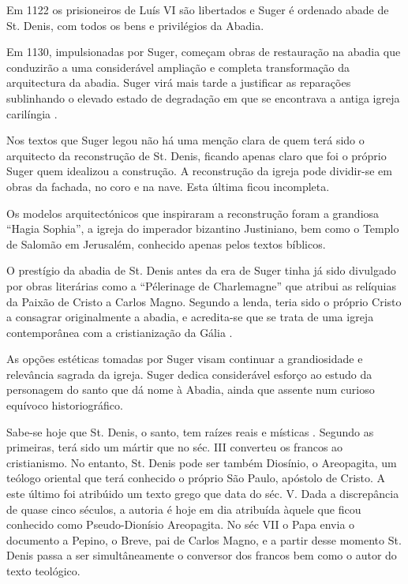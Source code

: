 \documentclass{article}
\begin{document}
Em 1122 os prisioneiros de Luís VI são libertados e Suger é ordenado
abade de St. Denis, com todos os bens e privilégios da Abadia.

Em 1130, impulsionadas por Suger, começam obras de restauração na
abadia que conduzirão a uma considerável ampliação e completa
transformação da arquitectura da abadia. Suger virá mais tarde a
justificar as reparações sublinhando o elevado estado de degradação em
que se encontrava a antiga igreja carilíngia \cite{calado}.

Nos textos que Suger legou não há uma menção clara de quem terá sido o
arquitecto da reconstrução de St. Denis, ficando apenas claro que foi
o próprio Suger quem idealizou a construção.  A reconstrução da igreja
pode dividir-se em obras da fachada, no coro e na nave. Esta última
ficou incompleta.

Os modelos arquitectónicos que inspiraram a reconstrução foram a
grandiosa ``Hagia Sophia'', a igreja do imperador bizantino
Justiniano, bem como o Templo de Salomão em Jerusalém, conhecido
apenas pelos textos bíblicos.

O prestígio da abadia de St. Denis antes da era de Suger tinha já sido
divulgado por obras literárias como a ``Pélerinage de Charlemagne''
que atribui as relíquias da Paixão de Cristo a Carlos Magno. Segundo a
lenda, teria sido o próprio Cristo a consagrar originalmente a abadia,
e acredita-se que se trata de uma igreja contemporânea com a
cristianização da Gália \cite{wiki-abadia}. 

As opções estéticas tomadas por Suger visam continuar a grandiosidade
e relevância sagrada da igreja. Suger dedica considerável esforço ao
estudo da personagem do santo que dá nome à Abadia, ainda que assente
num curioso equívoco historiográfico.

Sabe-se hoje que St. Denis, o santo, tem raízes reais e místicas
\cite{calado}. Segundo as primeiras, terá sido um mártir que no
séc. III converteu os francos ao cristianismo. No entanto, St. Denis
pode ser também Diosínio, o Areopagita, um teólogo oriental que terá
conhecido o próprio São Paulo, apóstolo de Cristo. A este último foi
atribúido um texto grego que data do séc. V. Dada a discrepância de
quase cinco séculos, a autoria é hoje em dia atribuída àquele que
ficou conhecido como Pseudo-Dionísio Areopagita. No séc VII o Papa
envia o documento a Pepino, o Breve, pai de Carlos Magno, e a partir
desse momento St. Denis passa a ser simultâneamente o conversor dos
francos bem como o autor do texto teológico.
\end{document}
